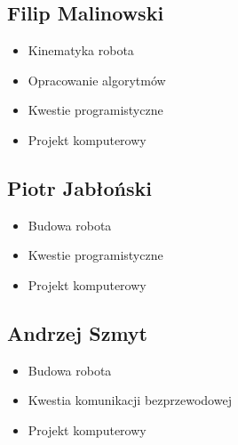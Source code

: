 \documentclass[a4paper]{article}
\begin{document}
    \subsection{Filip Malinowski}
        \begin{itemize}
            \item Kinematyka robota
            \item Opracowanie algorytmów
            \item Kwestie programistyczne
            \item Projekt komputerowy
        \end{itemize}
    \subsection{Piotr Jabłoński}
        \begin{itemize}
            \item Budowa robota
            \item Kwestie programistyczne
            \item Projekt komputerowy
        \end{itemize}
    \subsection{Andrzej Szmyt}
        \begin{itemize}
            \item Budowa robota
            \item Kwestia komunikacji bezprzewodowej
            \item Projekt komputerowy
        \end{itemize}
        
\end{document}
